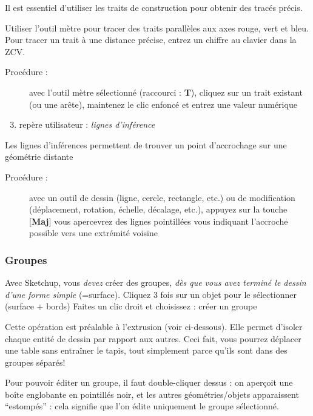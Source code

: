 \documentclass[a4paper,12pt,french]{sphinxmanual}
\begin{document}
Il est essentiel d'utiliser les traits de construction pour obtenir des tracés précis.

Utiliser l'outil mètre pour tracer des traits parallèles aux axes rouge, vert et bleu. Pour tracer un trait à une distance précise, entrez un chiffre au clavier dans la ZCV.
\begin{description}
\item[{Procédure :}] \leavevmode
avec l'outil mètre sélectionné (raccourci : \textbf{T}),
cliquez sur un trait existant (ou une arête),
maintenez le clic enfoncé et entrez une valeur numérique

\end{description}
\begin{enumerate}
\setcounter{enumi}{2}
\item {} 
repère utilisateur : \emph{lignes d'inférence}

\end{enumerate}

Les lignes d'inférences permettent de trouver un point d'accrochage sur une géométrie distante
\begin{description}
\item[{Procédure :}] \leavevmode
avec un outil de dessin (ligne, cercle, rectangle, etc.) ou de modification (déplacement, rotation, échelle, décalage, etc.),
appuyez sur la touche {[}\textbf{Maj}{]}
vous apercevrez des lignes pointillées vous indiquant l'accroche possible vers une extrémité voisine

\end{description}


\subsubsection{Groupes}
\label{su/intro-su:groupes}
Avec Sketchup, vous \emph{devez} créer des groupes, \emph{dès que vous avez terminé le dessin d'une forme simple} (=surface).
Cliquez 3 fois sur un objet pour le sélectionner (surface + bords)
Faites un clic droit et choisissez : créer un groupe

Cette opération est préalable à l'extrusion (voir ci-dessous). Elle permet d'isoler chaque entité de dessin par rapport aux autres. Ceci fait, vous pourrez déplacer une table sans entraîner le tapis, tout simplement parce qu'ils sont dans des groupes séparés!

Pour pouvoir éditer un groupe, il faut double-cliquer dessus : on aperçoit une boîte englobante en pointillés noir, et les autres géométries/objets apparaissent ``estompés'' : cela signifie que l'on édite uniquement le groupe sélectionné.
\end{document}
